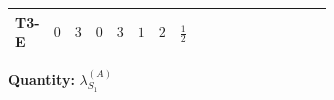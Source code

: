 \documentclass[8pt]{article}
\begin{document}
\begin{landscape}
\begin{longtable}{@{}llcccccc >{\raggedright\arraybackslash}p{0.21\linewidth} >{\raggedright\arraybackslash}p{0.21\linewidth} >{\raggedright\arraybackslash}p{0.21\linewidth}@{}}
\midrule
T3-E & $0$ & $3$ & $0$ & $3$ & $1$ & $2$ & $\frac{1}{2}$ & \scriptsize\adjustbox{max width=\linewidth}{$\begin{gathered} {\lambda_{S_1}^{(1)}} \left(\frac{1}{2} T_{\nu}^{(1)}+13 {\lambda_{S_1}^{(A)}}\right)\end{gathered}$} & \scriptsize\adjustbox{max width=\linewidth}{$\begin{gathered} +4 {\lambda_{S_1}^{(A)}} T_{\nu}^{(1)}\end{gathered}$} & \scriptsize\adjustbox{max width=\linewidth}{$\begin{gathered} -\operatorname{Tr}\!\left({y_1}\,\left({y_1}\right)^{\dagger}\,{y_1}\,\left({y_1}\right)^{\dagger}\right)\end{gathered}$} \\
\midrule
\bottomrule
\end{longtable}
\clearpage
\noindent\textbf{Quantity: }$\lambda_{S_1}^{(A)}$\par\smallskip

\end{landscape}
\end{document}
